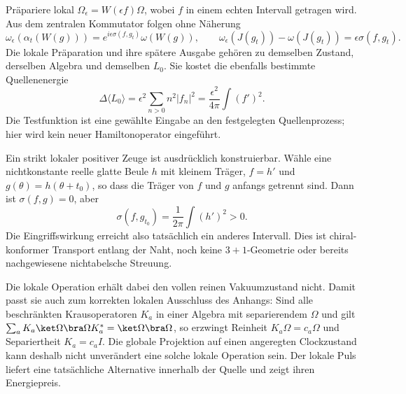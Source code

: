 Präpariere lokal $\Omega_\epsilon=W(\epsilon f)\Omega$, wobei $f$ in einem echten Intervall getragen wird. Aus dem zentralen Kommutator folgen ohne Näherung
\begin{equation}\label{eq:localcausalresponse}
\boxed{\omega_\epsilon(\alpha_t(W(g)))
=e^{i\epsilon\sigma(f,g_t)}\omega(W(g)),\qquad
\omega_\epsilon(J(g_t))-\omega(J(g_t))=\epsilon\sigma(f,g_t).}
\end{equation}
Die lokale Präparation und ihre spätere Ausgabe gehören zu demselben Zustand, derselben Algebra und demselben $L_0$. Sie kostet die ebenfalls bestimmte Quellenenergie
\begin{equation}
\Delta\langle L_0\rangle
=\epsilon^2\sum_{n>0}n^2|f_n|^2
=\frac{\epsilon^2}{4\pi}\int(f')^2.
\end{equation}
Die Testfunktion ist eine gewählte Eingabe an den festgelegten Quellenprozess; hier wird kein neuer Hamiltonoperator eingeführt.

Ein strikt lokaler positiver Zeuge ist ausdrücklich konstruierbar. Wähle eine nichtkonstante reelle glatte Beule $h$ mit kleinem Träger, $f=h'$ und $g(\theta)=h(\theta+t_0)$, so dass die Träger von $f$ und $g$ anfangs getrennt sind. Dann ist $\sigma(f,g)=0$, aber
\begin{equation}
\sigma(f,g_{t_0})=\frac1{2\pi}\int(h')^2>0.
\end{equation}
Die Eingriffswirkung erreicht also tatsächlich ein anderes Intervall. Dies ist chiral-konformer Transport entlang der Naht, noch keine $3+1$-Geometrie oder bereits nachgewiesene nichtabelsche Streuung.

Die lokale Operation erhält dabei den vollen reinen Vakuumzustand nicht. Damit passt sie auch zum korrekten lokalen Ausschluss des Anhangs: Sind alle beschränkten Krausoperatoren $K_a$ in einer Algebra mit separierendem $\Omega$ und gilt $\sum_aK_a\ket\Omega\bra\Omega K_a^*=\ket\Omega\bra\Omega$, so erzwingt Reinheit $K_a\Omega=c_a\Omega$ und Separiertheit $K_a=c_aI$. Die globale Projektion auf einen angeregten Clockzustand kann deshalb nicht unverändert eine solche lokale Operation sein. Der lokale Puls liefert eine tatsächliche Alternative innerhalb der Quelle und zeigt ihren Energiepreis.

